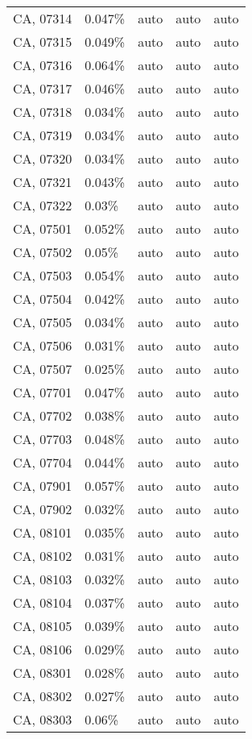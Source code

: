 \begin{longtable}[]{@{}lllll@{}}
CA, 07314 & 0.047\% & auto & auto & auto \\
CA, 07315 & 0.049\% & auto & auto & auto \\
CA, 07316 & 0.064\% & auto & auto & auto \\
CA, 07317 & 0.046\% & auto & auto & auto \\
CA, 07318 & 0.034\% & auto & auto & auto \\
CA, 07319 & 0.034\% & auto & auto & auto \\
CA, 07320 & 0.034\% & auto & auto & auto \\
CA, 07321 & 0.043\% & auto & auto & auto \\
CA, 07322 & 0.03\% & auto & auto & auto \\
CA, 07501 & 0.052\% & auto & auto & auto \\
CA, 07502 & 0.05\% & auto & auto & auto \\
CA, 07503 & 0.054\% & auto & auto & auto \\
CA, 07504 & 0.042\% & auto & auto & auto \\
CA, 07505 & 0.034\% & auto & auto & auto \\
CA, 07506 & 0.031\% & auto & auto & auto \\
CA, 07507 & 0.025\% & auto & auto & auto \\
CA, 07701 & 0.047\% & auto & auto & auto \\
CA, 07702 & 0.038\% & auto & auto & auto \\
CA, 07703 & 0.048\% & auto & auto & auto \\
CA, 07704 & 0.044\% & auto & auto & auto \\
CA, 07901 & 0.057\% & auto & auto & auto \\
CA, 07902 & 0.032\% & auto & auto & auto \\
CA, 08101 & 0.035\% & auto & auto & auto \\
CA, 08102 & 0.031\% & auto & auto & auto \\
CA, 08103 & 0.032\% & auto & auto & auto \\
CA, 08104 & 0.037\% & auto & auto & auto \\
CA, 08105 & 0.039\% & auto & auto & auto \\
CA, 08106 & 0.029\% & auto & auto & auto \\
CA, 08301 & 0.028\% & auto & auto & auto \\
CA, 08302 & 0.027\% & auto & auto & auto \\
CA, 08303 & 0.06\% & auto & auto & auto \\

\end{longtable}
